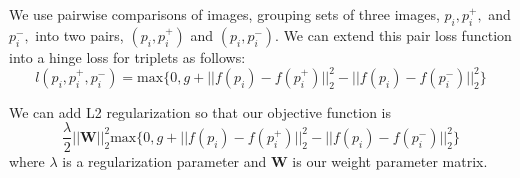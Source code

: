We use pairwise comparisons of images, grouping sets of three images, $p_i, p_i^+,$ and $p_i^-,$ into two pairs, $(p_i, p_i^+)$ and $(p_i, p_i^-)$. We can extend this pair loss function into a hinge loss for triplets as follows\cite{wang2014learning}:
\begin{equation}
	l(p_i, p_i^+, p_i^-) = \text{max}\{0, g + ||f(p_i) - f(p_i^+)||_2^2 - ||f(p_i)-f(p_i^-)||_2^2\}
\end{equation}

We can add L2 regularization so that our objective function is
\begin{equation}
	\dfrac{\lambda}{2}||\mathbf{W}||_2^2 \text{max}\{0, g + ||f(p_i) - f(p_i^+)||_2^2 - ||f(p_i)-f(p_i^-)||_2^2\}
\end{equation}
where $\lambda$ is a regularization parameter and $\mathbf{W}$ is our weight parameter matrix.
